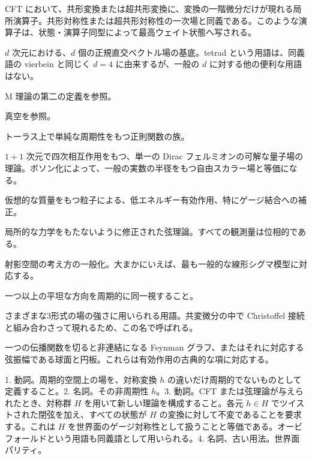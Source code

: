 {CFT において、共形変換または超共形変換に、変換の一階微分だけが現れる局所演算子。共形対称性または超共形対称性の一次場と同義である。このような演算子は、状態・演算子同型によって最高ウェイト状態へ写される。}

{$d$ 次元における、$d$ 個の正規直交ベクトル場の基底。tetrad という用語は、同義語の vierbein と同じく $d=4$ に由来するが、一般の $d$ に対する他の便利な用語はない。}

{M 理論の第二の定義を参照。}

{真空を参照。}

{トーラス上で単純な周期性をもつ正則関数の族。}

{$1+1$ 次元で四次相互作用をもつ、単一の Dirac フェルミオンの可解な量子場の理論。ボソン化によって、一般の実数の半径をもつ自由スカラー場と等価になる。}

{仮想的な質量をもつ粒子による、低エネルギー有効作用、特にゲージ結合への補正。}

{局所的な力学をもたないように修正された弦理論。すべての観測量は位相的である。}

{射影空間の考え方の一般化。大まかにいえば、最も一般的な線形シグマ模型に対応する。}

{一つ以上の平坦な方向を周期的に同一視すること。}

{さまざまな3形式の場の強さに用いられる用語。共変微分の中で Christoffel 接続と組み合わさって現れるため、この名で呼ばれる。}

{一つの伝播関数を切ると非連結になる Feynman グラフ、またはそれに対応する弦振幅である球面と円板。これらは有効作用の古典的な項に対応する。}

{1. 動詞。周期的空間上の場を、対称変換 $h$ の違いだけ周期的でないものとして定義すること。2. 名詞。その非周期性 $h$。3. 動詞。CFT または弦理論が与えられたとき、対称群 $H$ を用いて新しい理論を構成すること。各元 $h\in H$ でツイストされた閉弦を加え、すべての状態が $H$ の変換に対して不変であることを要求する。これは $H$ を世界面のゲージ対称性として扱うことと等価である。オービフォールドという用語も同義語として用いられる。4. 名詞、古い用法。世界面パリティ。}

